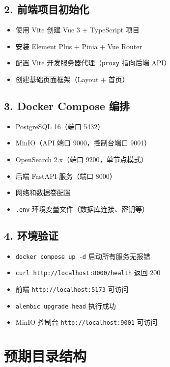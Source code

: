 \documentclass[11pt,a4paper]{article}
\begin{document}
\subsection{2. 前端项目初始化}

\begin{itemize}[nosep]
  \item 使用 Vite 创建 Vue 3 + TypeScript 项目
  \item 安装 Element Plus + Pinia + Vue Router
  \item 配置 Vite 开发服务器代理（\texttt{proxy} 指向后端 API）
  \item 创建基础页面框架（Layout + 首页）
\end{itemize}

\subsection{3. Docker Compose 编排}

\begin{itemize}[nosep]
  \item PostgreSQL 16（端口 5432）
  \item MinIO（API 端口 9000，控制台端口 9001）
  \item OpenSearch 2.x（端口 9200，单节点模式）
  \item 后端 FastAPI 服务（端口 8000）
  \item 网络和数据卷配置
  \item \texttt{.env} 环境变量文件（数据库连接、密钥等）
\end{itemize}

\subsection{4. 环境验证}

\begin{itemize}[nosep]
  \item \texttt{docker compose up -d} 启动所有服务无报错
  \item \texttt{curl http://localhost:8000/health} 返回 200
  \item 前端 \texttt{http://localhost:5173} 可访问
  \item \texttt{alembic upgrade head} 执行成功
  \item MinIO 控制台 \texttt{http://localhost:9001} 可访问
\end{itemize}

\section{预期目录结构}
\end{document}
